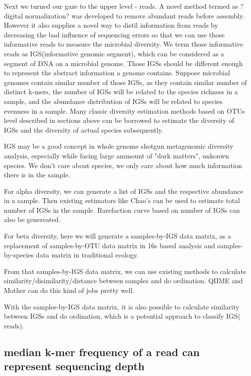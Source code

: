 \documentclass{article}
\begin{document}
Next we turned our gaze to the upper level - reads. A novel method termed as ?digital normalization? was developed to remove abundant reads before assembly. However it also supplies a novel way to distil information from reads by decreasing the bad influence of sequencing errors so that we can use those informative reads to measure the microbial diversity. We term those informative reads as IGS(informative genomic segment), which can be considered as a segment of DNA on a microbial genome. Those IGSs should be different enough to represent the abstract information a genome contains. Suppose microbial genomes contain similar number of those IGSs, as they contain similar number of distinct k-mers, the number of IGSs will be related to the species richness in a sample, and the abundance distribution of IGSs will be related to species evenness in a sample. Many classic diversity estimation methods based on OTUs level described in sections above can be borrowed to estimate the diversity of IGSs and the diversity of actual species subsequently.

IGS may be a good concept in whole genome shotgun metagenomic diversity analysis, especially while facing large ammount of "dark matters", unkonwn species. We don't care about species, we only care about how much information there is in the sample.


For alpha diversity, we can generate a list of IGSs and the respective abundance in a sample. Then existing estimators like Chao's can be used to estimate total number of IGSs in the sample. Rarefaction curve based on number of IGSs can also be genereated. 

For beta diversity, here we will generate a samples-by-IGS data matrix, as a replacement of samples-by-OTU data matrix in 16s based analysis and samples-by-species data matrix in traditional ecology. 


From that samples-by-IGS data matrix, we can use existing methods to calculate similarity/disimilarity/distance between samples and do ordination. QIIME and Mother can do this kind of jobs pretty well.

With the samples-by-IGS data matrix, it is also possible to calculate similarity between IGSs and do ordination, which is a potential approach to classify IGS( reads).


\subsection{median k-mer frequency of a read can represent sequencing depth}
\end{document}
